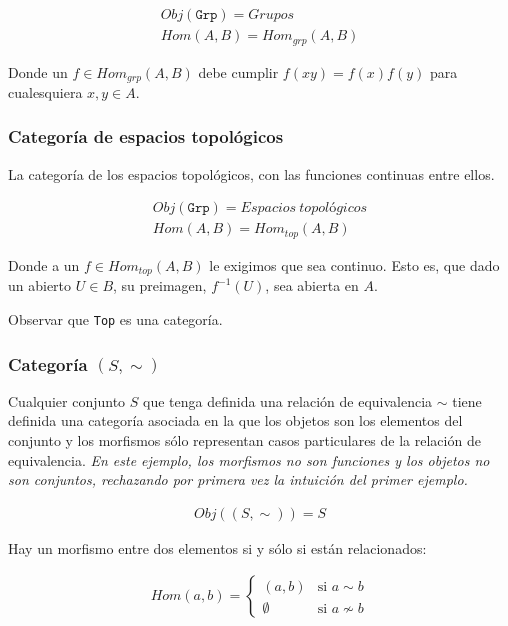 \documentclass[11pt, fleqn, spanish]{book}
\newcommand{\twopartdef}[4]
{
  \left\{
    \begin{array}{ll}
      #1 & \mbox{si } #2 \\
      #3 & \mbox{si } #4
    \end{array}
  \right.
}
\begin{document}
\begin{gather*}
  Obj(\texttt{Grp}) = Grupos \\
  Hom(A,B)= Hom_{grp}(A,B)
\end{gather*}

Donde un $f \in Hom_{grp}(A,B)$ debe cumplir $f(xy) = f(x)f(y)$ para cualesquiera $x,y \in A$.

\subsubsection{Categoría de espacios topológicos}
La categoría de los espacios topológicos, con las funciones continuas entre ellos.

\begin{gather*}
  Obj(\texttt{Grp}) = Espacios\ topológicos \\
  Hom(A,B)= Hom_{top}(A,B)
\end{gather*}

Donde a un $f \in Hom_{top}(A,B)$ le exigimos que sea continuo. Esto es, que dado
un abierto $U \in B$, su preimagen, $f^{-1}(U)$, sea abierta en $A$.

\begin{exercise}
  Observar que \texttt{Top} es una categoría.
\end{exercise}


\subsubsection{Categoría \texttt{$(S,\sim)$}}
Cualquier conjunto $S$ que tenga definida una relación de equivalencia $\sim$ tiene
definida una categoría asociada en la que los objetos son los elementos del conjunto
y los morfismos sólo representan casos particulares de la relación de equivalencia.
\textit{En este ejemplo, los morfismos no son funciones y los objetos no son conjuntos,
  rechazando por primera vez la intuición del primer ejemplo.}

\begin{gather*}
  Obj((S,\sim)) = S
\end{gather*}

Hay un morfismo entre dos elementos si y sólo si están relacionados:

\begin{align*}
  Hom(a,b)= \twopartdef{(a,b)}{a \sim b}{\emptyset}{a \nsim b}
\end{align*}
\end{document}
